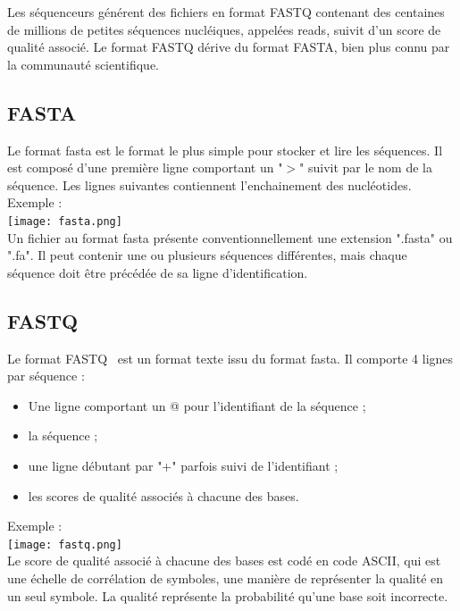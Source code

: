 \documentclass[a4paper,12pt]{article}
\begin{document}
Les séquenceurs générent des fichiers en format FASTQ contenant des centaines de millions de petites séquences nucléiques, appelées reads, suivit d'un score de qualité associé. Le format FASTQ dérive du format FASTA, bien plus connu par la communauté scientifique. 

\subsection{FASTA}
Le format fasta est le format le plus simple pour stocker et lire les séquences. Il est composé d'une première ligne comportant un "$>$" suivit par le nom de la séquence. Les lignes suivantes contiennent l'enchainement des nucléotides. \\

Exemple : \\

\texttt{[image: fasta.png]}~\\

Un fichier au format fasta présente conventionnellement une extension ".fasta" ou ".fa". Il peut contenir une ou plusieurs séquences différentes, mais chaque séquence doit être précédée de sa ligne d'identification. 

\subsection{FASTQ}

Le format FASTQ~\cite{fastq} est un format texte issu du format fasta. Il comporte 4 lignes par séquence :
\begin{itemize}
\item Une ligne comportant un @ pour l'identifiant de la séquence ;
\item la séquence ;
\item une ligne débutant par "+" parfois suivi de l’identifiant ;
\item les scores de qualité associés à chacune des bases.
\end{itemize}
\clearpage
Exemple : \\

\texttt{[image: fastq.png]}~\\

Le score de qualité associé à chacune des bases est codé en code ASCII, qui est une échelle de corrélation de symboles, une manière de représenter la qualité en un seul symbole. La qualité représente la probabilité qu'une base soit incorrecte. \\
\end{document}
